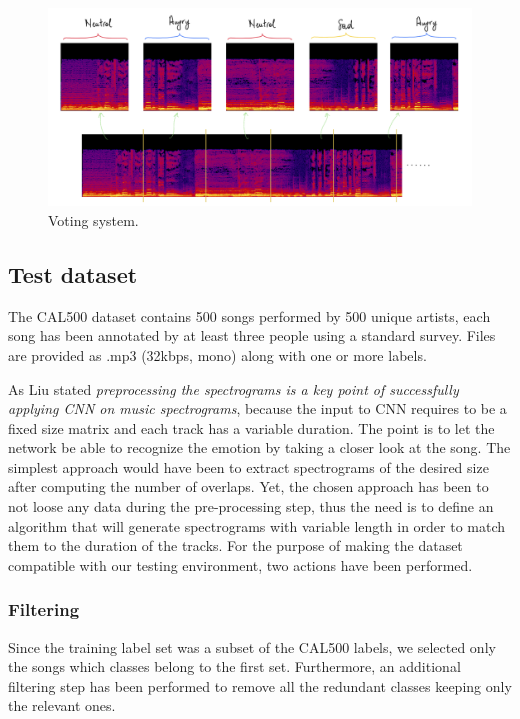 \documentclass[10pt,twocolumn,letterpaper]{article}
\begin{document}
   \begin{figure}
      \begin{center}
      \includegraphics[width=0.8\linewidth]{img/voting-system}
      \end{center}
         \caption{Voting system.}
      \label{fig:voting}
      \end{figure}

\subsection{Test dataset}\label{test-dataset}

The CAL500 dataset contains 500 songs performed by 500 unique artists, each song has been annotated by at least three people using a standard survey. Files are provided as .mp3 (32kbps, mono) along with one or more labels.

As Liu \etal \cite{Liu} stated \textit{preprocessing the spectrograms is a key point of successfully applying CNN on music spectrograms}, because the input to CNN requires to be a fixed size matrix and each track has a variable duration. The point is to let the network be able to recognize the emotion by taking a closer look at the song. The simplest approach would have been to extract spectrograms of the desired size after computing the number of overlaps. Yet, the chosen approach has been to not loose any data during the pre-processing step, thus the need is to define an algorithm that will generate spectrograms with variable length in order to match them to the duration of the tracks.
For the purpose of making the dataset compatible with our testing environment, two actions have been performed.

\subsubsection{Filtering}\label{filtering}

Since the training label set was a subset of the CAL500 labels, we selected only the songs which classes belong to the first set. Furthermore, an additional filtering step has been performed to remove all the redundant classes keeping only the relevant ones.
\end{document}
